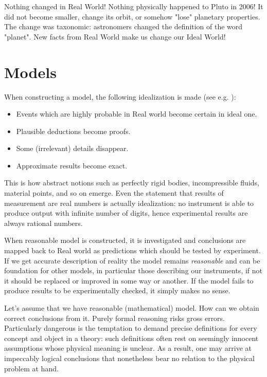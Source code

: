 Nothing changed in Real World! Nothing physically happened to Pluto in 2006!
It did not become smaller, change its orbit, or somehow "lose" planetary
properties. The change was taxonomic: astronomers changed the definition of the
word "planet". New facts from Real World make us change our Ideal World!


\section{Models}
\label{sec:rm-mo}

When constructing a model, the following idealization is
made (see e.g. \cite{Arnold1998}): 
\begin{itemize}
    \item Events which are  highly probable in Real world become certain in ideal one.
    \item Plausible deductions become proofs.
    \item Some (irrelevant) details disappear.
    \item Approximate results become exact.
\end{itemize}               

This is how abstract notions such as perfectly rigid bodies, incompressible
fluids, material points, and so on emerge. Even the statement that results of
measurement are real numbers is actually idealization: no instrument is able to
produce output with infinite number of digits, hence experimental results are
always rational numbers.

When reasonable model is constructed, it is investigated and conclusions are
mapped back to Real world as predictions which should be tested by  experiment.
If we get  accurate description of reality the model remains {\em reasonable}
and can be foundation for other models, in particular those describing our
instruments, if not it  should be replaced or improved in some way or another.
If the model fails to produce results to be experimentally checked, it simply
makes no sense.

Let's assume that we have reasonable (mathematical) model. How can we obtain
correct conclusions from it. Purely formal reasoning risks gross errors.
Particularly dangerous is the temptation to demand precise  definitions for
every concept and object in a theory: such definitions often rest on seemingly
innocent assumptions whose physical meaning is unclear. As a result, one may
arrive at impeccably logical conclusions that nonetheless bear no relation to
the physical problem at hand.

